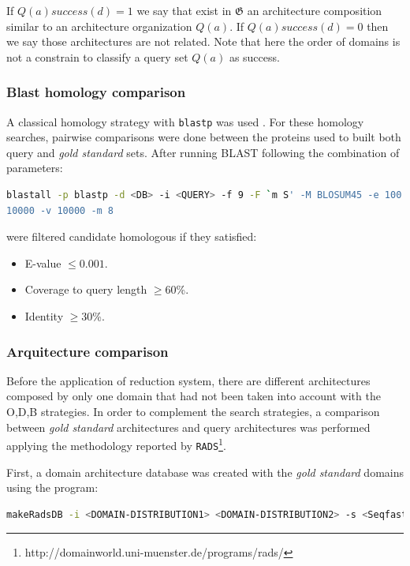 \documentclass[11pt]{article}
\begin{document}
If $Q(a){success(d)} = 1$ we say that exist in $\boldsymbol{\mathfrak{G}}$ 
an architecture composition similar to an architecture organization $Q(a)$. 
If $Q(a){success(d)} = 0$ then we say those architectures are not related. 
Note that here the order of domains  is not a constrain to classify a query set 
$Q(a)$ as success.

\subsubsection*{\textbf{B}last homology comparison}
A classical homology strategy with \texttt{blastp} was used \cite{Korf:2003}. 
For these homology searches, pairwise comparisons were done between the 
proteins used to built both query and \textsl{gold standard} sets. After running 
BLAST following the combination of parameters: 
\begin{lstlisting}[language=bash, breaklines=true]
blastall -p blastp -d <DB> -i <QUERY> -f 9 -F `m S' -M BLOSUM45 -e 100 -b 
10000 -v 10000 -m 8
\end{lstlisting}

were filtered candidate homologous if they satisfied:
\begin{itemize}
\item E-value $\leq 0.001$.
\item Coverage to query length $\geq 60$\%.
\item Identity $\geq 30$\%.
\end{itemize}

\subsubsection*{\textbf{A}rquitecture comparison}
Before the application of reduction system, there are different 
architectures composed by only one domain that had not been taken into account 
with the O,D,B strategies. In order to complement the search strategies, a
comparison between \textsl{gold standard} architectures and query architectures 
was performed applying the methodology reported 
by \texttt{RADS}\footnote{http://domainworld.uni-muenster.de/programs/rads/}\cite{Terrapon:2014}.

First, a domain architecture database was created with the \textsl{gold standard} domains using the program:
\begin{lstlisting}[language=bash, breaklines=true]
makeRadsDB -i <DOMAIN-DISTRIBUTION1> <DOMAIN-DISTRIBUTION2> -s <Seqfasta1> <Seqfasta2> seqFile2.fa -o <OUT-DB>.
\end{lstlisting}
\end{document}
